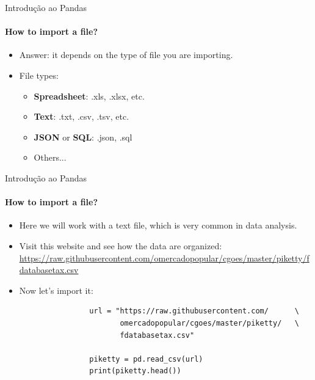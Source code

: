 \documentclass[notes,11pt, aspectratio=169, xcolor=table]{beamer}
\begin{document}
        \begin{frame}[fragile=singleslide]{Introdução ao Pandas}
        \framesubtitle{How to import a file?}
            
             \begin{itemize}
    
                \item Answer: it depends on the type of file you are importing.
                
                \item File types:
                
                    \begin{itemize}
                        \item \textbf{Spreadsheet}: .xls, .xlsx, etc.
                        \item \textbf{Text}: .txt, .csv, .tsv, etc.
                        \item \textbf{JSON} or \textbf{SQL}: .json, .sql
                        \item Others...
                    \end{itemize}
                    
            \end{itemize}             
    
        \end{frame}        

        \begin{frame}[fragile=singleslide]{Introdução ao Pandas}
        \framesubtitle{How to import a file?}
            
             \begin{itemize}
    
                \item Here we will work with a text file, which is very common in data analysis.

                \item Visit this website and see how the data are organized: \url{https://raw.githubusercontent.com/omercadopopular/cgoes/master/piketty/fdatabasetax.csv}

                \item Now let’s import it:
                
                \begin{verbatim}
                url = "https://raw.githubusercontent.com/      \
                       omercadopopular/cgoes/master/piketty/   \
                       fdatabasetax.csv"
                
                piketty = pd.read_csv(url)
                print(piketty.head())
                \end{verbatim}
                
                    
            \end{itemize}             
    
        \end{frame}        
\end{document}
